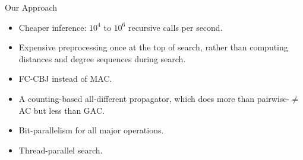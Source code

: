 \documentclass{beamer}
\begin{document}
\begin{frame}{Our Approach}
    \begin{itemize}
        \item \textcolor{uofgrose}{Cheaper inference}: $10^4$ to $10^6$ recursive calls per second.
        \item Expensive \textcolor{uofgrose}{preprocessing once} at the top of search, rather
            than computing distances and degree sequences during search.
        \item FC-CBJ instead of MAC.
        \item A \textcolor{uofgrose}{counting-based all-different} propagator, which does more
            than pairwise-$\ne$ AC but less than GAC.
        \item \textcolor{uofgrose}{Bit-parallelism} for all major operations.
        \item \textcolor{uofgrose}{Thread-parallel} search.
    \end{itemize}
\end{frame}
\end{document}
